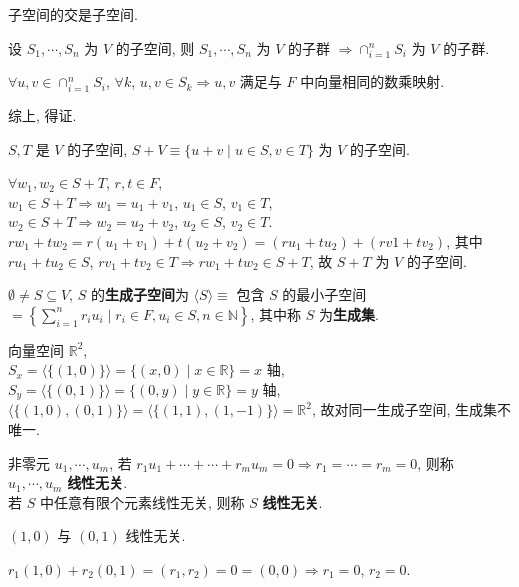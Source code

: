 \documentclass{note}
\begin{document}
子空间的交是子空间.
\begin{pf}
    设 $S_1,\cdots,S_n$ 为 $V$ 的子空间, 则 $S_1,\cdots,S_n$ 为 $V$ 的子群 $\Longrightarrow\cap_{i=1}^nS_i$ 为 $V$ 的子群.

    $\forall u,v\in\cap_{i=1}^nS_i$, $\forall k$, $u,v\in S_k\Longrightarrow u,v$ 满足与 $F$ 中向量相同的数乘映射.

    综上, 得证.
\end{pf}

$S,T$ 是 $V$ 的子空间, $S+V\equiv\{u+v\mid u\in S,v\in T\}$ 为 $V$ 的子空间.
\begin{pf}
    $\forall w_1,w_2\in S+T$, $r,t\in F$,\\
    $w_1\in S+T\Longrightarrow w_1=u_1+v_1$, $u_1\in S$, $v_1\in T$,\\
    $w_2\in S+T\Longrightarrow w_2=u_2+v_2$, $u_2\in S$, $v_2\in T$.\\
    $rw_1+tw_2=r(u_1+v_1)+t(u_2+v_2)=(ru_1+tu_2)+(rv1+tv_2)$, 其中 $ru_1+tu_2\in S$, $rv_1+tv_2\in T\Longrightarrow rw_1+tw_2\in S+T$, 故 $S+T$ 为 $V$ 的子空间.
\end{pf}

\begin{df}[生成子空间和生成集]
    $\emptyset\neq S\subseteq V$, $S$ 的\textbf{生成子空间}为 $\langle S\rangle\equiv$ 包含 $S$ 的最小子空间 $=\left\{\sum_{i=1}^nr_iu_i\mid r_i\in F,u_i\in S,n\in\mathbb{N}\right\}$, 其中称 $S$ 为\textbf{生成集}.
\end{df}

\begin{eg}
    向量空间 $\mathbb{R}^2$,\\
    $S_x=\langle\{(1,0)\}\rangle=\{(x,0)\mid x\in\mathbb{R}\}=x$ 轴,\\
    $S_y=\langle\{(0,1)\}\rangle=\{(0,y)\mid y\in\mathbb{R}\}=y$ 轴,\\
    $\langle\{(1,0),(0,1)\}\rangle=\langle\{(1,1),(1,-1)\}\rangle=\mathbb{R}^2$, 故对同一生成子空间, 生成集不唯一.
\end{eg}

\begin{df}[线性无关]
    非零元 $u_1,\cdots,u_m$, 若 $r_1u_1+\cdots+\cdots+r_mu_m=0\Longrightarrow r_1=\cdots=r_m=0$, 则称 $u_1,\cdots,u_m$ \textbf{线性无关}.\\
    若 $S$ 中任意有限个元素线性无关, 则称 $S$ \textbf{线性无关}.
\end{df}

\begin{eg}
    $(1,0)$ 与 $(0,1)$ 线性无关.
\end{eg}
\begin{pf}
    $r_1(1,0)+r_2(0,1)=(r_1,r_2)=0=(0,0)\Longrightarrow r_1=0$, $r_2=0$.
\end{pf}
\end{document}
